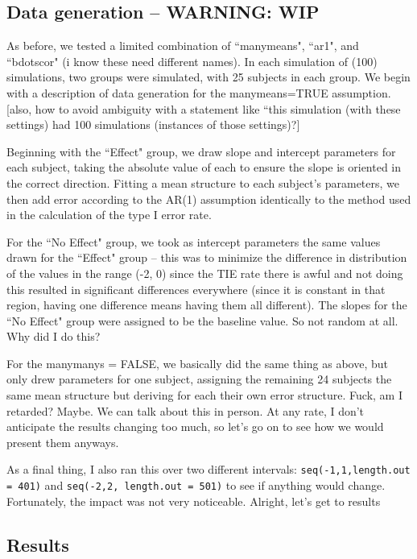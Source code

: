 \documentclass{article}
\newcommand{\xt}{\texttt}
\begin{document}
\subsection{Data generation -- WARNING: WIP} As before, we tested a limited combination of ``manymeans", ``ar1", and ``bdotscor" (i know these need different names). In each simulation of (100) simulations, two groups were simulated, with 25 subjects in each group. We begin with a description of data generation for the manymeans=TRUE assumption. [also, how to avoid ambiguity with a statement like ``this simulation (with these settings) had 100 simulations (instances of those settings)?]

Beginning with the ``Effect" group, we draw slope and intercept parameters for each subject, taking the absolute value of each to ensure the slope is oriented in the correct direction. Fitting a mean structure to each subject's parameters, we then add error according to the AR(1) assumption identically to the method used in the calculation of the type I error rate.

For the ``No Effect" group, we took as intercept parameters the same values drawn for the ``Effect" group -- this was to minimize the difference in distribution of the values in the range (-2, 0) since the TIE rate there is awful and not doing this resulted in significant differences everywhere (since it is constant in that region, having one difference means having them all different). The slopes for the ``No Effect" group were assigned to be the baseline value. So not random at all. Why did I do this?

For the manymanys = FALSE, we basically did the same thing as above, but only drew parameters for one subject, assigning the remaining 24 subjects the same mean structure but deriving for each their own error structure. Fuck, am I retarded? Maybe. We can talk about this in person. At any rate, I don't anticipate the results changing too much, so let's go on to see how we would present them anyways.

As a final thing, I also ran this over two different intervals: \xt{seq(-1,1,length.out = 401)} and \xt{seq(-2,2, length.out = 501)} to see if anything would change. Fortunately, the impact was not very noticeable. Alright, let's get to results

\subsection{Results}
\end{document}
